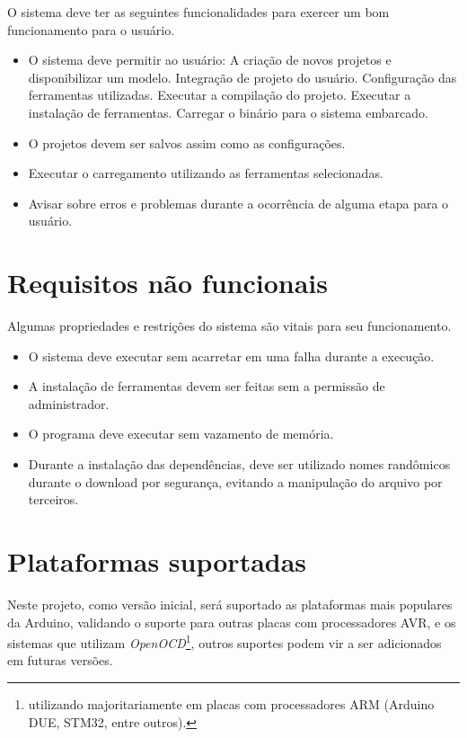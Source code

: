O sistema deve ter as seguintes funcionalidades para exercer um bom funcionamento para o usuário.
\begin{itemize}
\item O sistema deve permitir ao usuário:
	\subitem A criação de novos projetos e disponibilizar um modelo.
	\subitem Integração de projeto do usuário.
    \subitem Configuração das ferramentas utilizadas.
	\subitem Executar a compilação do projeto.
	\subitem Executar a instalação de ferramentas.
	\subitem Carregar o binário para o sistema embarcado.
\item O projetos devem ser salvos assim como as configurações.
\item Executar o carregamento utilizando as ferramentas selecionadas.
\item Avisar sobre erros e problemas durante a ocorrência de alguma etapa para o usuário.	
\end{itemize}

\section{Requisitos não funcionais}
Algumas propriedades e restrições do sistema são vitais para seu funcionamento.
\begin{itemize}
\item O sistema deve executar sem acarretar em uma falha durante a execução.
\item A instalação de ferramentas devem ser feitas sem a permissão de administrador.
\item O programa deve executar sem vazamento de memória.
\item Durante a instalação das dependências, deve ser utilizado nomes randômicos durante o download por segurança, evitando a manipulação do arquivo por terceiros.
\end{itemize}

\section{Plataformas suportadas}

Neste projeto, como versão inicial, será suportado as plataformas mais populares da Arduino, validando o suporte para outras placas com processadores AVR, e os sistemas que utilizam \textit{OpenOCD}\footnote{utilizando majoritariamente em placas com processadores ARM (Arduino DUE, STM32, entre outros).}, outros suportes podem vir a ser adicionados em futuras versões.


